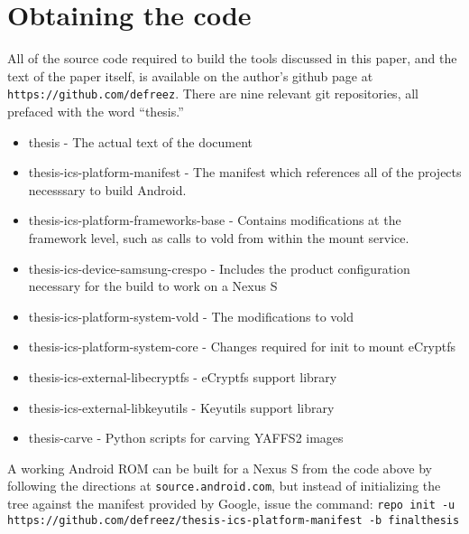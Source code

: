 \chapter{Obtaining the code}
\label{app:obtaincode}

All of the source code required to build the tools discussed in this paper, and the text of the paper itself,  is available on the author's github page at
\texttt{https://github.com/defreez}. There are nine relevant git repositories, all prefaced with the word ``thesis.''
\begin{itemize}
\item{thesis} - The actual text of the document
\item{thesis-ics-platform-manifest - The manifest which references all of the projects necesssary to build Android.}
\item{thesis-ics-platform-frameworks-base - Contains modifications at the framework level, such as calls to vold from within the
mount service.}
\item{thesis-ics-device-samsung-crespo - Includes the product configuration necessary for the build to work on a Nexus S}
\item{thesis-ics-platform-system-vold - The modifications to vold}
\item{thesis-ics-platform-system-core - Changes required for init to mount eCryptfs}
\item{thesis-ics-external-libecryptfs - eCryptfs support library}
\item{thesis-ics-external-libkeyutils - Keyutils support library}
\item{thesis-carve - Python scripts for carving YAFFS2 images}
\end{itemize}

A working Android ROM can be built for a Nexus S from the code above by following the directions at \texttt{source.android.com}, but
instead of initializing the tree against the manifest provided by Google, issue the command: \texttt{repo init -u
https://github.com/defreez/thesis-ics-platform-manifest -b finalthesis}

